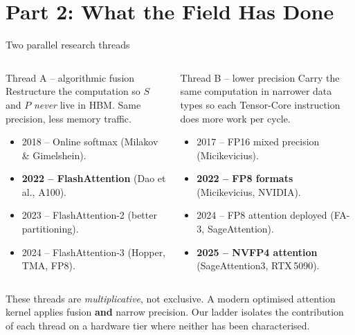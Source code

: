 \documentclass[10pt,aspectratio=169]{beamer}
\begin{document}
\section{Part 2: What the Field Has Done}

\begin{frame}{Two parallel research threads}
  \begin{columns}[T]
      \begin{block}{Thread A -- algorithmic fusion}
        Restructure the computation so $S$ and $P$ \emph{never} live in
        HBM. Same precision, less memory traffic.
        \begin{itemize}
          \item 2018 -- Online softmax (Milakov \& Gimelshein).
          \item \textbf{2022 -- FlashAttention} (Dao et al., A100).
          \item 2023 -- FlashAttention-2 (better partitioning).
          \item 2024 -- FlashAttention-3 (Hopper, TMA, FP8).
        \end{itemize}
      \end{block}
      \begin{block}{Thread B -- lower precision}
        Carry the same computation in narrower data types so each
        Tensor-Core instruction does more work per cycle.
        \begin{itemize}
          \item 2017 -- FP16 mixed precision (Micikevicius).
          \item \textbf{2022 -- FP8 formats} (Micikevicius, NVIDIA).
          \item 2024 -- FP8 attention deployed (FA-3, SageAttention).
          \item \textbf{2025 -- NVFP4 attention} (SageAttention3, RTX\,5090).
        \end{itemize}
      \end{block}
  \end{columns}
  \vspace{0.4em}
  \begin{tldr}
    These threads are \emph{multiplicative}, not exclusive. A modern
    optimised attention kernel applies fusion \textbf{and} narrow
    precision. Our ladder isolates the contribution of each thread on
    a hardware tier where neither has been characterised.
  \end{tldr}
\end{frame}
\end{document}
